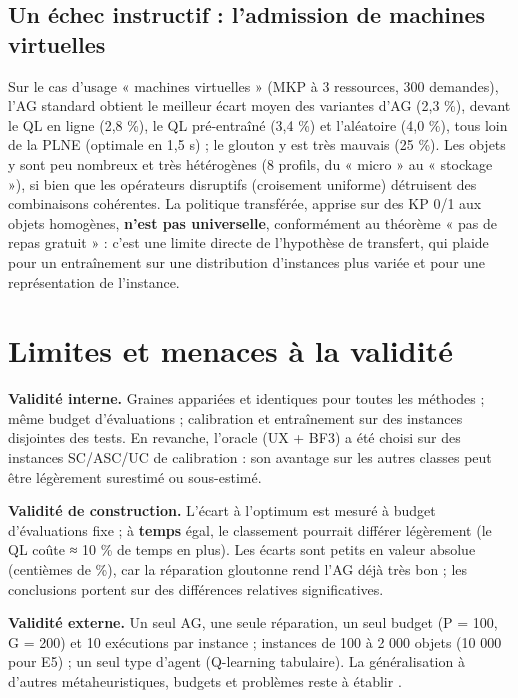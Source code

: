 \documentclass[
  french,
  11pt,
  a4paper,
]{article}
\begin{document}
\subsection{Un échec instructif : l'admission de machines
virtuelles}\label{discussion-un-uxe9chec-instructif-ladmission-de-machines-virtuelles}

Sur le cas d'usage « machines virtuelles » (MKP à 3 ressources, 300
demandes), l'AG standard obtient le meilleur écart moyen des variantes
d'AG (2,3 \%), devant le QL en ligne (2,8 \%), le QL pré-entraîné (3,4
\%) et l'aléatoire (4,0 \%), tous loin de la PLNE (optimale en 1,5 s) ;
le glouton y est très mauvais (25 \%). Les objets y sont peu nombreux et
très hétérogènes (8 profils, du « micro » au « stockage »), si bien que
les opérateurs disruptifs (croisement uniforme) détruisent des
combinaisons cohérentes. La politique transférée, apprise sur des KP 0/1
aux objets homogènes, \textbf{n'est pas universelle}, conformément au
théorème « pas de repas gratuit » \autocite{wolpert_macready_1997} :
c'est une limite directe de l'hypothèse de transfert, qui plaide pour un
entraînement sur une distribution d'instances plus variée et pour une
représentation de l'instance.

\section{Limites et menaces à la
validité}\label{discussion-limites-et-menaces-uxe0-la-validituxe9}

\textbf{Validité interne.} Graines appariées et identiques pour toutes
les méthodes ; même budget d'évaluations ; calibration et entraînement
sur des instances disjointes des tests. En revanche, l'oracle (UX + BF3)
a été choisi sur des instances SC/ASC/UC de calibration : son avantage
sur les autres classes peut être légèrement surestimé ou sous-estimé.

\textbf{Validité de construction.} L'écart à l'optimum est mesuré à
budget d'évaluations fixe ; à \textbf{temps} égal, le classement
pourrait différer légèrement (le QL coûte ≈ 10 \% de temps en plus). Les
écarts sont petits en valeur absolue (centièmes de \%), car la
réparation gloutonne rend l'AG déjà très bon ; les conclusions portent
sur des différences relatives significatives.

\textbf{Validité externe.} Un seul AG, une seule réparation, un seul
budget (P = 100, G = 200) et 10 exécutions par instance ; instances de
100 à 2 000 objets (10 000 pour E5) ; un seul type d'agent (Q-learning
tabulaire). La généralisation à d'autres métaheuristiques, budgets et
problèmes reste à établir
\autocite{rajwar_exhaustive_2023,dokeroglu_hyper-heuristics_2024}.
\end{document}
